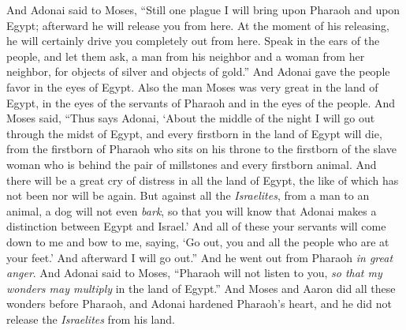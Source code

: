 \begin{biblechapter} %
 And Adonai said to Moses, “Still one plague I will bring upon Pharaoh and upon Egypt; afterward he will release you from here. At the moment of his releasing, he will certainly drive you completely out from here.
\verse Speak in the ears of the people, and let them ask, a man from his neighbor and a woman from her neighbor, for objects of silver and objects of gold.”
\verse And Adonai gave the people favor in the eyes of Egypt. Also the man Moses was very great in the land of Egypt, in the eyes of the servants of Pharaoh and in the eyes of the people.
\verse And Moses said, “Thus says Adonai, ‘About the middle of the night I will go out through the midst of Egypt,
\verse and every firstborn in the land of Egypt will die, from the firstborn of Pharaoh who sits on his throne to the firstborn of the slave woman who is behind the pair of millstones and every firstborn animal.
\verse And there will be a great cry of distress in all the land of Egypt, the like of which has not been nor will be again.
\verse But against all the \textit{Israelites}, from a man to an animal, a dog will not even \textit{bark}, so that you will know that Adonai makes a distinction between Egypt and Israel.’
\verse And all of these your servants will come down to me and bow to me, saying, ‘Go out, you and all the people who are at your feet.’ And afterward I will go out.” And he went out from Pharaoh \textit{in great anger}.
\verse And Adonai said to Moses, “Pharaoh will not listen to you, \textit{so that my wonders may multiply} in the land of Egypt.”
\verse And Moses and Aaron did all these wonders before Pharaoh, and Adonai hardened Pharaoh’s heart, and he did not release the \textit{Israelites} from his land.
\end{biblechapter}

